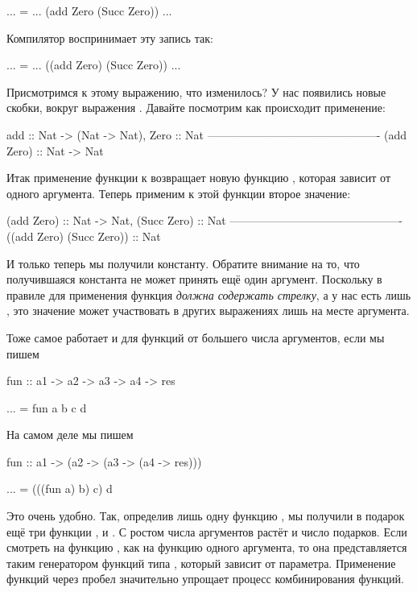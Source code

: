 \begin{code}
... =  ... (add Zero (Succ Zero)) ...
\end{code}

Компилятор воспринимает эту запись так:


\begin{code}
... =  ... ((add Zero) (Succ Zero)) ...
\end{code}

Присмотримся к этому выражению, что изменилось? У нас появились новые
скобки, вокруг выражения . Давайте посмотрим как
происходит применение:


\begin{code}
              add :: Nat -> (Nat -> Nat),       Zero :: Nat
              ----------------------------------------------
                        (add Zero) :: Nat -> Nat
\end{code}

Итак применение функции  к  возвращает новую функцию
, которая зависит от одного аргумента. Теперь применим к
этой функции второе значение:


\begin{code}
              (add Zero) :: Nat -> Nat,   (Succ Zero) :: Nat
              ----------------------------------------------
                     ((add Zero) (Succ Zero)) :: Nat
\end{code}

И только теперь мы получили константу. Обратите внимание на то, что
получившаяся константа не может принять ещё один аргумент. Поскольку в
правиле для применения функция  \emph{должна содержать стрелку}, а
у нас есть лишь , это значение может участвовать в других
выражениях лишь на месте аргумента.

Тоже самое работает и для функций от большего числа аргументов, если мы
пишем


\begin{code}
fun :: a1 -> a2 -> a3 -> a4 -> res

... = fun a b c d
\end{code}

На самом деле мы пишем


\begin{code}
fun :: a1 -> (a2 -> (a3 -> (a4 -> res)))

... = (((fun a) b) c) d
\end{code}

Это очень удобно. Так, определив лишь одну функцию , мы получили
в подарок ещё три функции ,  и
. С ростом числа аргументов растёт и число подарков.
Если смотреть на функцию , как на функцию одного аргумента, то
она представляется таким генератором функций типа
, который зависит от параметра. Применение
функций через пробел значительно упрощает процесс комбинирования
функций.

